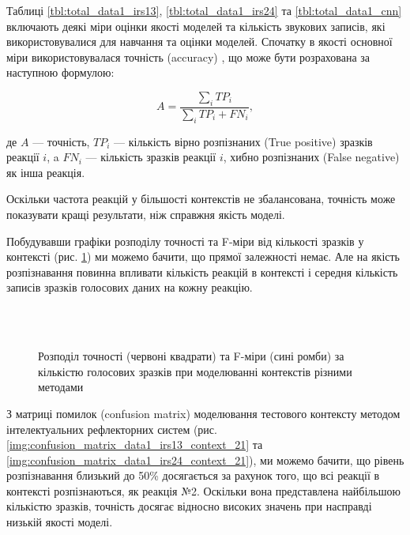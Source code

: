 Таблиці \ref{tbl:total_data1_irs13}, \ref{tbl:total_data1_irs24} та \ref{tbl:total_data1_cnn} включають деякі міри оцінки якості моделей та кількість звукових записів, які використовувалися для навчання та оцінки моделей. Спочатку в якості основної міри використовувалася точність (accuracy) \cite{Ting_2011}, що може бути розрахована за наступною формулою:

\begin{equation}
\label{eq:acuracy}
A=\frac{\sum\limits_i TP_i}{\sum\limits_i TP_i+FN_i},
\end{equation}

де $A$ --- точність, $TP_i$ --- кількість вірно розпізнаних (True positive) зразків реакції $i$, a $FN_i$ --- кількість зразків реакції $i$, хибно розпізнаних (False negative) як інша реакція.

Оскільки частота реакцій у більшості контекстів не збалансована, точність може показувати кращі результати, ніж справжня якість моделі.

Побудувавши графіки розподілу точності та F-міри від кількості зразків у контексті (рис. \ref{img:accuracy_distribution_data1}) ми можемо бачити, що прямої залежності немає. Але на якість розпізнавання повинна впливати кількість реакцій в контексті і середня кількість записів зразків голосових даних на кожну реакцію.

\begin{figure}[!t]
	\centering
	\\
	\\
	\caption{Розподіл точності (червоні квадрати) та F-міри (сині ромби) за кількістю голосових зразків при моделюванні контекстів різними методами}
	\label{img:accuracy_distribution_data1}
\end{figure}

З матриці помилок (confusion matrix) \cite{Stehman_1997} моделювання тестового контексту методом інтелектуальних рефлекторних систем (рис. \ref{img:confusion_matrix_data1_irs13_context_21} та \ref{img:confusion_matrix_data1_irs24_context_21}), ми можемо бачити, що рівень розпізнавання близький до 50\% досягається за рахунок того, що всі реакції в контексті розпізнаються, як реакція №2. Оскільки вона представлена найбільшою кількістю зразків, точність досягає відносно високих значень при насправді низькій якості моделі.

